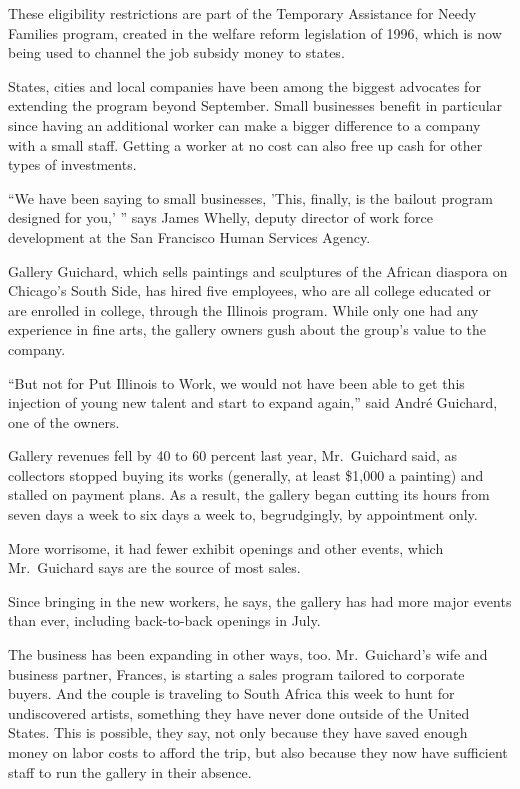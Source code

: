 ﻿\documentclass[12pt]{article}
\begin{document}
These eligibility restrictions are part of the Temporary Assistance for Needy Families program,
created in the welfare reform legislation of 1996, which is now being used to channel the job
subsidy money to states.

States, cities and local companies have been among the biggest advocates for extending the program
beyond September. Small businesses benefit in particular since having an additional worker can make
a bigger difference to a company with a small staff. Getting a worker at no cost can also free up
cash for other types of investments.

``We have been saying to small businesses, 'This, finally, is the bailout program designed for you,'
'' says James Whelly, deputy director of work force development at the San Francisco Human Services
Agency.

Gallery Guichard, which sells paintings and sculptures of the African diaspora on Chicago's South
Side, has hired five employees, who are all college educated or are enrolled in college, through the
Illinois program. While only one had any experience in fine arts, the gallery owners gush about the
group's value to the company.

``But not for Put Illinois to Work, we would not have been able to get this injection of young new
talent and start to expand again,'' said Andr\'e Guichard, one of the owners.

Gallery revenues fell by 40 to 60 percent last year, Mr.~Guichard said, as collectors stopped buying
its works (generally, at least \$1,000 a painting) and stalled on payment plans. As a result, the
gallery began cutting its hours from seven days a week to six days a week to, begrudgingly, by
appointment only.

More worrisome, it had fewer exhibit openings and other events, which Mr.~Guichard says are the
source of most sales.

Since bringing in the new workers, he says, the gallery has had more major events than ever,
including back-to-back openings in July.

The business has been expanding in other ways, too. Mr.~Guichard's wife and business partner,
Frances, is starting a sales program tailored to corporate buyers. And the couple is traveling to
South Africa this week to hunt for undiscovered artists, something they have never done outside of
the United States. This is possible, they say, not only because they have saved enough money on
labor costs to afford the trip, but also because they now have sufficient staff to run the gallery
in their absence.
\end{document}
